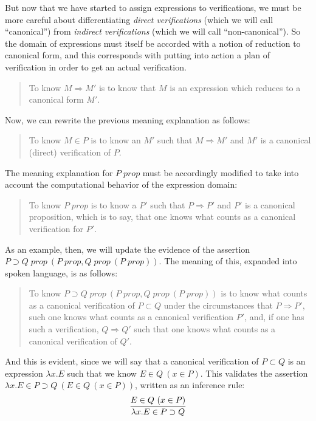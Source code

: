 \documentclass{amsart}
\theoremstyle{definition}
\theoremstyle{remark}
\numberwithin{equation}{section}
\newcommand\isprop[1]{\ensuremath{#1\;\mathit{prop}}}
\newcommand\hyp[2]{\ensuremath{#1\ (#2)}}
\newcommand\ver[2]{\ensuremath{#1\in#2}}
\newcommand\reduce[2]{\ensuremath{#1\Rightarrow#2}}
\begin{document}
But now that we have started to assign expressions to verifications, we must be
more careful about differentiating \emph{direct verifications} (which we will
call ``canonical'') from \emph{indirect verifications} (which we will call
``non-canonical''). So the domain of expressions must itself be accorded with a
notion of reduction to canonical form, and this corresponds with putting into
action a plan of verification in order to get an actual verification.
\begin{quote}
  To know \reduce{M}{M'} is to know that $M$ is an expression which reduces to
  a canonical form $M'$.
\end{quote}

Now, we can rewrite the previous meaning explanation as follows:
\begin{quote}
  To know \ver{M}{P} is to know an $M'$ such that \reduce{M}{M'} and $M'$ is a
  canonical (direct) verification of $P$.
\end{quote}

The meaning explanation for \isprop{P} must be accordingly modified to take
into account the computational behavior of the expression domain:
\begin{quote}
  To know \isprop{P} is to know a $P'$ such that \reduce{P}{P'} and $P'$ is a
  canonical proposition, which is to say, that one knows what counts as a
  canonical verification for $P'$.
\end{quote}

As an example, then, we will update the evidence of the assertion
\hyp{\isprop{P\supset Q}}{\isprop{P},\hyp{\isprop{Q}}{\isprop{P}}}. The meaning
of this, expanded into spoken language, is as follows:
\begin{quote}
  To know \hyp{\isprop{P\supset Q}}{\isprop{P},\hyp{\isprop{Q}}{\isprop{P}}} is
  to know what counts as a canonical verification of $P\subset Q$ under
  the circumstances that \reduce{P}{P'}, such one knows what counts as a
  canonical verification $P'$, and, if one has such a verification,
  \reduce{Q}{Q'} such that one knows what counts as a canonical verification of
  $Q'$.
\end{quote}

And this is evident, since we will say that a canonical verification of
$P\subset Q$ is an expression $\lambda x. E$ such that we know
\hyp{\ver{E}{Q}}{\ver{x}{P}}. This validates the assertion \hyp{\ver{\lambda
x.E}{P\supset Q}}{\hyp{\ver{E}{Q}}{\ver{x}{P}}}, written as an inference rule:
\[
  \infer{
    \ver{\lambda x.E}{P\supset Q}
  }{
    \hyp{\ver{E}{Q}}{\ver{x}{P}}
  }
\]
\end{document}
